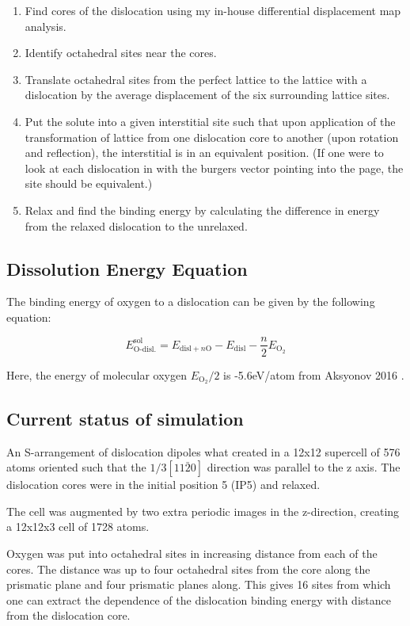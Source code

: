\documentclass[11pt]{article}
\begin{document}
\begin{enumerate}
\item Find cores of the dislocation using my in-house differential
displacement map analysis.
\item Identify octahedral sites near the cores.
\item Translate octahedral sites from the perfect lattice to the
lattice with a dislocation by the average displacement of the six
surrounding lattice sites.
\item Put the solute into a given interstitial site such that upon
application of the transformation of lattice from one
dislocation core to another (upon rotation and reflection), the
interstitial is in an equivalent position. (If one were to look
at each dislocation in with the burgers vector pointing into the
page, the site should be equivalent.)
\item Relax and find the binding energy by calculating the difference
in energy from the relaxed dislocation to the unrelaxed.
\end{enumerate}


\subsection{Dissolution Energy Equation}
\label{sec:org3a28d38}

The binding energy of oxygen to a dislocation can be given by the
following equation:

\[ E^{\text{sol}}_{\text{O-disl.}} = E_{\text{disl} + n\text{O}} -
   E_{\text{disl}} - \frac{n}{2} E_{\text{O}_2}   \]

Here, the energy of molecular oxygen \(E_{\text{O}_2}/2\) is -5.6eV/atom
from Aksyonov 2016 \cite{Aksyonov2016}. 



\subsection{Current status of simulation}
\label{sec:orgd8f9671}

An S-arrangement of dislocation dipoles what created in a 12x12
supercell of 576 atoms oriented such that the \(1/3[11\bar{2}0]\)
direction was parallel to the z axis. The dislocation cores were in
the initial position 5 (IP5) and relaxed.

The cell was augmented by two extra periodic images in the
z-direction, creating a 12x12x3 cell of 1728 atoms. 

Oxygen was put into octahedral sites in increasing distance
from each of the cores. The distance was up to four octahedral sites
from the core along the prismatic plane and four prismatic planes
along. This gives 16 sites from which one can extract the
dependence of the dislocation binding energy with distance from the
dislocation core.
\end{document}
